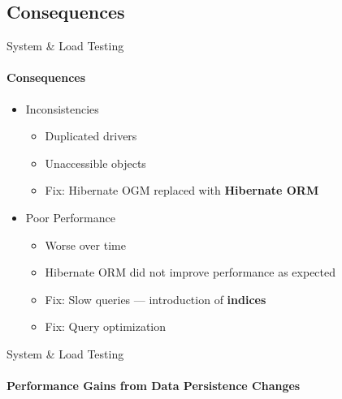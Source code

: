 \subsection{Consequences}
\begin{frame}{System \& Load Testing}
        \framesubtitle{Consequences}
        \begin{itemize}
            \item<1-> Inconsistencies
                \begin{itemize}
                    \item Duplicated drivers
                    \item Unaccessible objects
                    \item Fix: Hibernate OGM replaced with \textbf{Hibernate ORM}
                \end{itemize}
            \item<2-> Poor Performance
                \begin{itemize}
                    \item Worse over time
                    \item Hibernate ORM did not improve performance as expected
                    \item Fix: Slow queries --- introduction of \textbf{indices}
                    \item Fix: Query optimization
                \end{itemize}
        \end{itemize}
\end{frame}

\begin{frame}{System \& Load Testing}
        \framesubtitle{Performance Gains from Data Persistence Changes}
        \begin{figure}[htb]
            \centering
        \end{figure}
\end{frame}
